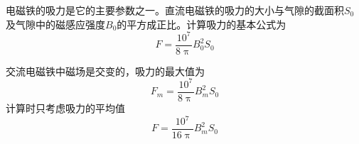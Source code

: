 \documentclass[12pt]{article}
\begin{document}
电磁铁的吸力是它的主要参数之一。直流电磁铁的吸力的大小与气隙的截面积\(S_0\)及气隙中的磁感应强度\(B_0\)的平方成正比。计算吸力的基本公式为
\begin{equation}
    F = \frac{10^7}{8 \uppi} B_0^2 S_0
\end{equation}

交流电磁铁中磁场是交变的，吸力的最大值为
\begin{equation}
    F_m = \frac{10^7}{8 \uppi} B_m^2 S_0
\end{equation}
计算时只考虑吸力的平均值
\begin{equation}
    F = \frac{10^7}{16 \uppi} B_m^2 S_0
\end{equation}
\end{document}
